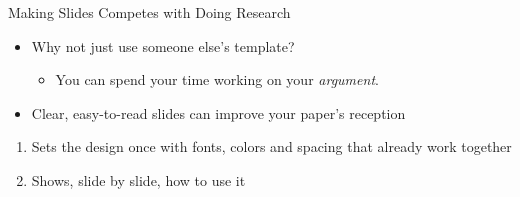 

\begin{frame}{Making Slides Competes with Doing Research}
\begin{itemize}
    \item Why not just use someone else's template?
    \begin{itemize}
    \item You can spend your time working on your \emph{argument}.
\end{itemize}
\end{itemize}

\vfill
\pause

\begin{itemize}
 \item[\textcolor{accent}{$\blacktriangleright$}] Clear, easy-to-read slides can improve your paper's reception
\end{itemize}

\vspace{0.5cm}

\vfill
\pause


\begin{enumerate}

\item Sets the design once with fonts, colors and spacing that already work together

\item Shows, slide by slide, how to use it

\end{enumerate}
\end{frame}



